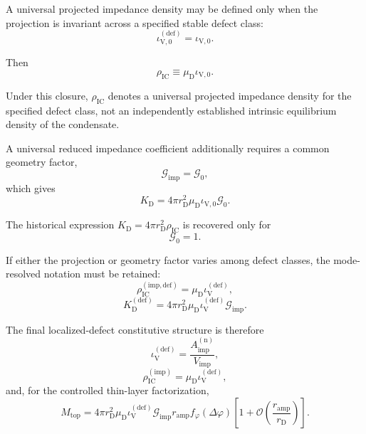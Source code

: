 A universal projected impedance density may be defined only when the projection is invariant across a specified stable defect class:
\begin{equation}
    \iota_{\mathrm{V},0}^{(\mathrm{def})} = \iota_{\mathrm{V},0}.
\end{equation}

Then
\begin{equation}
    \rho_{\mathrm{IC}} \equiv \mu_{\mathrm{D}}\iota_{\mathrm{V},0}.
\end{equation}

Under this closure, $\rho_{\mathrm{IC}}$ denotes a universal projected impedance density for the specified defect class, not an independently established intrinsic equilibrium density of the condensate.

A universal reduced impedance coefficient additionally requires a common geometry factor,
\begin{equation}
    \mathcal{G}_{\mathrm{imp}} = \mathcal{G}_{0},
\end{equation}
which gives
\begin{equation}
    K_{\mathrm{D}} = 4\pi r_{\mathrm{D}}^2\mu_{\mathrm{D}}\iota_{\mathrm{V},0}\mathcal{G}_{0}.
\end{equation}

The historical expression $K_{\mathrm{D}} = 4\pi r_{\mathrm{D}}^2\rho_{\mathrm{IC}}$ is recovered only for
\begin{equation}
    \mathcal{G}_{0} = 1.
\end{equation}

If either the projection or geometry factor varies among defect classes, the mode-resolved notation must be retained:
\begin{equation}
    \rho_{\mathrm{IC}}^{(\mathrm{imp,def})} = \mu_{\mathrm{D}}\iota_{\mathrm{V}}^{(\mathrm{def})},
\end{equation}
\begin{equation}
    K_{\mathrm{D}}^{(\mathrm{def})} = 4\pi r_{\mathrm{D}}^2\mu_{\mathrm{D}}\iota_{\mathrm{V}}^{(\mathrm{def})}\mathcal{G}_{\mathrm{imp}}.
\end{equation}

The final localized-defect constitutive structure is therefore
\begin{equation}
    \iota_{\mathrm{V}}^{(\mathrm{def})} = \frac{A_{\mathrm{imp}}^{(\mathrm{n})}}{V_{\mathrm{imp}}},
\end{equation}
\begin{equation}
    \rho_{\mathrm{IC}}^{(\mathrm{imp})} = \mu_{\mathrm{D}}\iota_{\mathrm{V}}^{(\mathrm{def})},
\end{equation}
and, for the controlled thin-layer factorization,
\begin{equation}
    M_{\mathrm{top}} = 4\pi r_{\mathrm{D}}^2\mu_{\mathrm{D}}\iota_{\mathrm{V}}^{(\mathrm{def})}\mathcal{G}_{\mathrm{imp}}r_{\mathrm{amp}}f_{\varphi}(\Delta\varphi)\left[1+\mathcal{O}\left(\frac{r_{\mathrm{amp}}}{r_{\mathrm{D}}}\right)\right].
\end{equation}

